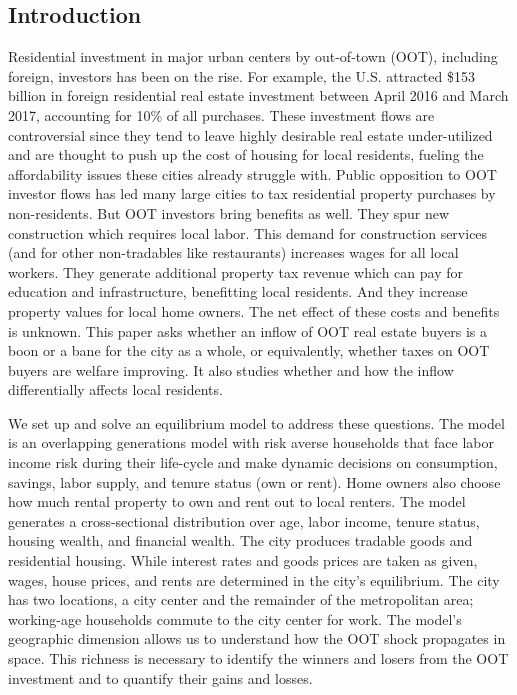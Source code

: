 \documentclass[letterpaper,12pt,dvipsnames,usenames]{article}
\theoremstyle{definition}
\begin{document}
\begin{spacing}{1.25}

\setcounter{page}{1}

\section{Introduction}

Residential investment in major urban centers by out-of-town (OOT), including foreign, investors has been on the rise. For example, the U.S. attracted \$153 billion in foreign residential real estate investment between April 2016 and March 2017, accounting for 10\% of all purchases. These investment flows are controversial since they tend to  leave highly desirable real estate under-utilized and are thought to push up the cost of housing for local residents, fueling the affordability issues these cities already struggle with. Public opposition to OOT investor flows has led many large cities to tax  residential property purchases by non-residents. But OOT investors bring benefits as well. They spur new construction which requires local labor. This demand for construction services (and for other non-tradables like restaurants) increases wages for all local workers. They generate additional property tax revenue which can pay for  education and infrastructure, benefitting local residents. And they increase property values for local home owners. The net effect of these costs and benefits is unknown. This paper asks whether an inflow of OOT real estate buyers is a boon or a bane for the city as a whole, or equivalently, whether taxes on OOT buyers are welfare improving. It also studies whether and how the inflow differentially affects local residents.

We set up and solve an equilibrium model to address these questions. The model is an overlapping generations model with risk averse households that face labor income risk during their life-cycle and make dynamic decisions on consumption, savings, labor supply, and tenure status (own or rent). Home owners also choose how much rental property to own and rent out to local renters. The model generates a cross-sectional distribution over age, labor income, tenure status, housing wealth, and financial wealth.  The city produces tradable goods and residential housing. While interest rates and goods prices are taken as given, wages, house prices, and rents are determined in the city's equilibrium. The city has two locations, a city center and the remainder of the metropolitan area; working-age households commute to the city center for work. The model's geographic dimension allows us to understand how the OOT shock propagates in space. This richness is necessary to identify the winners and losers from the OOT investment and to quantify their gains and losses.


\end{spacing}
\end{document}
